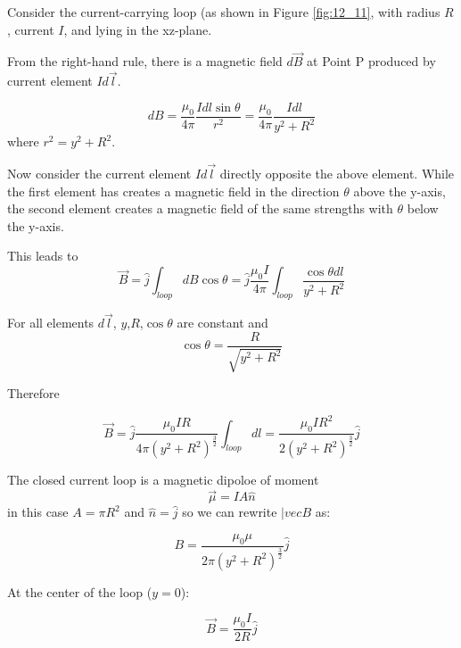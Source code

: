 \documentclass[14pt]{memoir}
\begin{document}
Consider the current-carrying loop (as shown in Figure \ref{fig:12_11}, with radius $R$, current $I$, and lying in the xz-plane.

From the right-hand rule, there is a magnetic field $d\vec{B}$ at Point P produced by current element $Id\vec{l}$.

\begin{equation}
dB = \frac{\mu_0}{4 \pi} \frac{I dl \sin{\theta}}{r^2} = \frac{\mu_0}{4 \pi}  \frac{I dl}{y^2 + R^2}
\end{equation}
where $r^2 = y^2 + R^2$.

Now consider the current element $Id\vec{l}$ directly opposite the above element. While the first element has creates a magnetic field in the direction $\theta$ above the y-axis, the second element creates a magnetic field of the same strengths with $\theta$ below the y-axis. 

This leads to 
\begin{equation}
\vec{B} = \hat{j} \int_{loop} dB \cos{\theta} = \hat{j}\frac{\mu_0 I}{4 \pi} \int_{loop} \frac{\cos{\theta} dl}{y^2 + R^2}
\end{equation}

For all elements $d\vec{l}$, $y$,$R$,$\cos{\theta}$ are constant and 
\begin{equation}
\cos{\theta} = \frac{R}{\sqrt{y^2 + R^2}}
\end{equation}

Therefore

\begin{equation}
\vec{B} = \hat{j} \frac{\mu_0 I R}{4 \pi (y^2+R^2)^{\frac{3}{2}}} \int_{loop} dl = \frac{\mu_0 I R^2}{2 (y^2+R^2)^{\frac{3}{2}}} \hat{j}
\end{equation}

The closed current loop is a magnetic dipoloe of moment 
\begin{equation}
\vec{\mu} = IA \hat{n}
\end{equation}
in this case $A = \pi R^2$ and $\hat{n} = \hat{j}$ so we can rewrite $|vec{B}$ as:

\begin{equation}
B = \frac{\mu_0 \mu}{2 \pi (y^2+R^2)^{\frac{3}{2}}} \hat{j}
\end{equation}

At the center of the loop ($y = 0$):

\begin{equation}
\vec{B} = \frac{\mu_0 I}{2R} \hat{j}
\end{equation}
\end{document}
